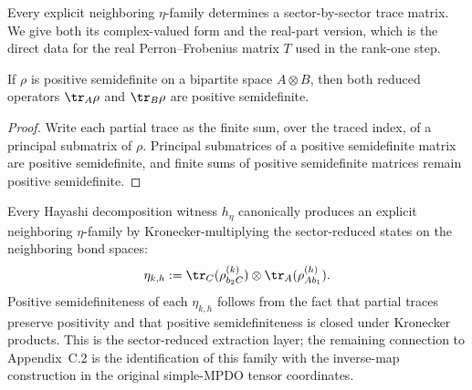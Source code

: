 \begin{definition}
    \label{def:mpdo_explicit_eta_trace_matrix}
    \leanok
    Every explicit neighboring $\eta$-family determines a sector-by-sector trace
    matrix. We give both its complex-valued form and the real-part version,
    which is the direct data for the real Perron--Frobenius matrix $T$ used
    in the rank-one step.
\end{definition}


\begin{theorem}
    \label{thm:matrix_possemidef_partial_traces}
    \leanok
    If $\rho$ is positive semidefinite on a bipartite space $A \otimes B$, then
    both reduced operators $\tr_A \rho$ and $\tr_B \rho$ are positive
    semidefinite.
\end{theorem}

\begin{proof}
    \leanok
    Write each partial trace as the finite sum, over the traced index, of a
    principal submatrix of $\rho$. Principal submatrices of a positive
    semidefinite matrix are positive semidefinite, and finite sums of positive
    semidefinite matrices remain positive semidefinite.
\end{proof}

\begin{definition}
    \label{def:mpdo_eta_of_hayashi_markov}
    \leanok
    Every Hayashi decomposition witness $h_\eta$ canonically produces an
    explicit neighboring $\eta$-family by Kronecker-multiplying the
    sector-reduced states on the neighboring bond spaces:
    \[
        \eta_{k,h}
        := \tr_C(\rho_{b_2 C}^{(k)})
        \otimes \tr_A(\rho_{A b_1}^{(h)}).
    \]
    Positive semidefiniteness of each $\eta_{k,h}$ follows from the fact
    that partial traces preserve positivity and that positive
    semidefiniteness is closed under Kronecker products. This is the
    sector-reduced extraction layer; the remaining connection to
    Appendix~C.2 is the identification of this family with the inverse-map
    construction in the original simple-MPDO tensor coordinates.
\end{definition}

